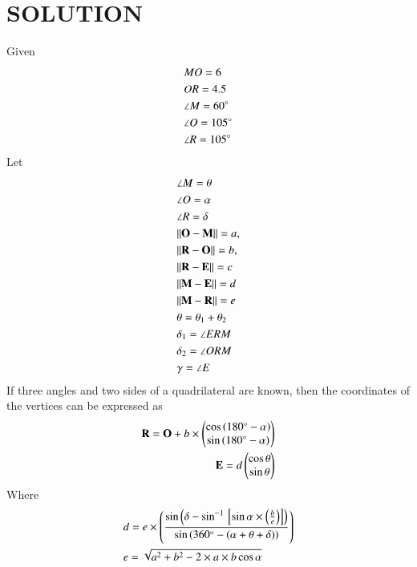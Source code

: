 \documentclass[journal,12pt,twocolumn]{IEEEtran}
\begin{document}
\section{SOLUTION}
\begin{lemma}
Given 
\begin{align}
    &MO = 6\\
    &OR = 4.5\\
    &\angle M = 60 \degree\\
    &\angle O = 105 \degree\\
    &\angle R = 105 \degree
\end{align}
Let
\begin{align}
        &\angle M=\theta \label{eq1}
    \\
    &\angle O=\alpha
    \\
    &\angle R=\delta \label{eq2}
    \\
    &\lVert\mathbf{O}-\mathbf{M}\rVert =a, \label{eq3}
    \\
    &\lVert\mathbf{R}-\mathbf{O}\rVert =b,\label{eq4}
    \\
 &\lVert\mathbf{R}-\mathbf{E}\rVert=c
 \\
  &\lVert\mathbf{M}-\mathbf{E}\rVert =d 
  \\
    &\lVert\mathbf{M}-\mathbf{R}\rVert =e
  \\
  &\theta= \theta_1 + \theta_2
  \\
  & \delta_1=\angle ERM \\
  & \delta_2= \angle ORM\\
  & \gamma= \angle E
\end{align}
If three angles and two sides of a quadrilateral are known, then the coordinates of the vertices can be expressed as
\begin{align}
    \mathbf{R}=\mathbf{O}+b\times \begin{pmatrix}\cos {(180\degree-\alpha)} \\ \sin{(180\degree - \alpha)}\end{pmatrix}\\
    \mathbf{E}=d \begin{pmatrix}\cos \theta \\ \sin \theta\end{pmatrix}
\end{align}
Where
    \begin{align}
    &d=e \times \left(\frac{\sin\left({\delta-\sin^{-1}{}\left[\sin{\alpha}\times \left(\frac{b}{e}\right)\right]}\right)}{\sin\left({360\degree-(\alpha+\theta+\delta)}\right)}\right)\\
   & e=\sqrt{a^2+b^2-2\times a \times b\cos{\alpha}}
\end{align}
\end{lemma}
\end{document}
